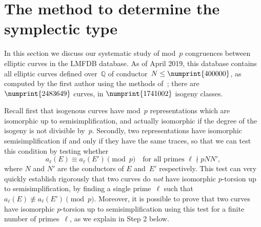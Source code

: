 \documentclass[12pt]{amsart}
\newcommand{\Q}{\mathbb{Q}}
\numberwithin{equation}{section}
\theoremstyle{definition}
\theoremstyle{remark}
\begin{document}
\section{The method to determine the symplectic type}\label{S:statistics}

In this section we discuss our systematic study of mod~$p$ congruences
between elliptic curves in the LMFDB database.  As of April 2019, this
database contains all elliptic curves defined over~$\Q$ of
conductor~$N\le\numprint{400000}$, as computed by the first author
using the methods of~\cite{AMEC}; there are $\numprint{2483649}$
curves, in $\numprint{1741002}$ isogeny classes.

Recall first that isogenous curves have mod~$p$ representations which
are isomorphic up to semisimplification, and actually isomorphic if
the degree of the isogeny is not divisible by~$p$.  Secondly, two
representations have isomorphic semisimplification if and only if they
have the same traces, so that we can test this condition by testing
whether
\[ a_{\ell}(E)\equiv a_{\ell}(E')\pmod{p}
\quad \text{for all primes } \ell \nmid pNN',
\] 
where $N$ and $N'$ are the conductors of $E$
and~$E'$ respectively.  This test can very quickly establish rigorously
that two curves do \emph{not} have isomorphic $p$-torsion up to
semisimplification, by finding  a single
prime~$\ell$ such that $a_{\ell}(E)\not\equiv a_{\ell}(E')\pmod{p}$.
Moreover, it is possible to prove that two curves have isomorphic $p$-torsion up to
semisimplification using this test for a finite number of
primes~$\ell$, as we explain in Step 2 below.
\end{document}
